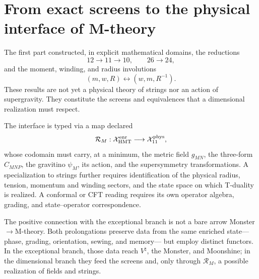 \section{From exact screens to the physical interface of M-theory}
\label{sec:interfaz-teoria-m-rev8}

The first part constructed, in explicit mathematical domains, the reductions
\[
12\longrightarrow11\longrightarrow10,
\qquad
26\longrightarrow24,
\]
and the moment, winding, and radius involutions
\[
(m,w,R)\longleftrightarrow(w,m,R^{-1}).
\]
These results are not yet a physical theory of strings nor an action
of supergravity. They constitute the screens and equivalences that a
dimensional realization must respect.

The interface is typed via a map declared
\[
\mathcal R_M:\mathcal X_{\rm HMT}^{\rm enr}
\longrightarrow
\mathcal X_{11}^{\rm phys},
\]
whose codomain must carry, at a minimum, the metric field \(g_{MN}\), the three-form \(C_{MNP}\), the gravitino \(\psi_M\), its action, and the supersymmetry transformations. A specialization to strings further requires identification of the physical radius, tension, momentum and winding sectors, and the state space on which T-duality is realized. A conformal or CFT reading requires its own operator algebra, grading, and state--operator correspondence.

The positive connection with the exceptional branch is not a bare arrow
Monster\(\to\)M-theory. Both prolongations preserve data from the same
enriched state---phase, grading, orientation, sewing, and memory---
but employ distinct functors. In the exceptional branch, those data reach
\(V^\natural\), the Monster, and Moonshine; in the dimensional branch they feed
the screens and, only through \(\mathcal R_M\), a possible realization of
fields and strings.

